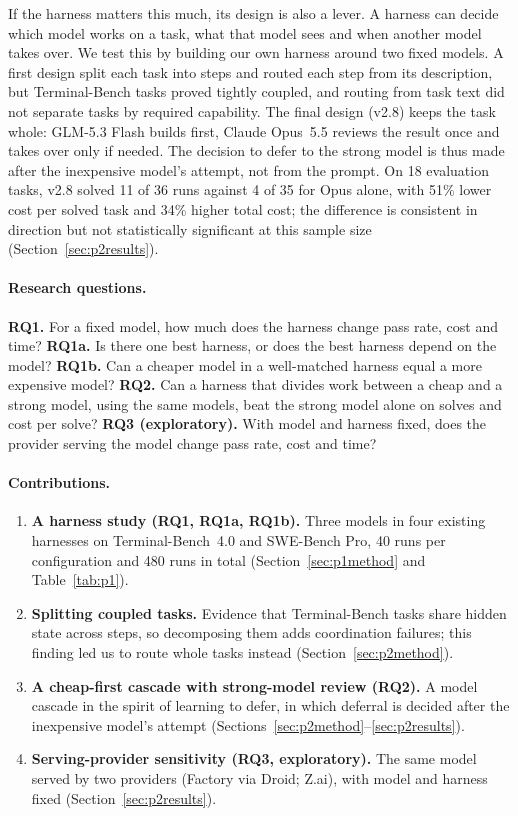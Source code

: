 If the harness matters this much, its design is also a lever. A harness can decide which model works on a task,
what that model sees and when another model takes over. We test this by building our own harness around two
fixed models. A first design split each task into steps and routed each step from its description, but
Terminal-Bench tasks proved tightly coupled, and routing from task text did not separate tasks by required
capability. The final design (v2.8) keeps the task whole: GLM-5.3 Flash builds first, Claude Opus~5.5 reviews the
result once and takes over only if needed. The decision to defer to the strong model is thus made after the
inexpensive model's attempt, not from the prompt. On 18 evaluation tasks, v2.8 solved 11 of 36 runs against 4 of
35 for Opus alone, with 51\% lower cost per solved task and 34\% higher total cost; the difference is consistent
in direction but not statistically significant at this sample size (Section~\ref{sec:p2results}).

\paragraph{Research questions.}
\textbf{RQ1.} For a fixed model, how much does the harness change pass rate, cost and time?
\textbf{RQ1a.} Is there one best harness, or does the best harness depend on the model?
\textbf{RQ1b.} Can a cheaper model in a well-matched harness equal a more expensive model?
\textbf{RQ2.} Can a harness that divides work between a cheap and a strong model, using the same models, beat
the strong model alone on solves and cost per solve?
\textbf{RQ3 (exploratory).} With model and harness fixed, does the provider serving the model change pass rate,
cost and time?
\paragraph{Contributions.}
\begin{enumerate}
  \item \textbf{A harness study (RQ1, RQ1a, RQ1b).} Three models in four existing harnesses on Terminal-Bench~4.0
        and SWE-Bench Pro, 40 runs per configuration and 480 runs in total
        (Section~\ref{sec:p1method} and Table~\ref{tab:p1}).
  \item \textbf{Splitting coupled tasks.} Evidence that Terminal-Bench tasks share hidden state across steps, so
        decomposing them adds coordination failures; this finding led us to route whole tasks instead
        (Section~\ref{sec:p2method}).
  \item \textbf{A cheap-first cascade with strong-model review (RQ2).} A model cascade in the spirit of
        learning to defer, in which deferral is decided after the inexpensive model's attempt
        (Sections~\ref{sec:p2method}--\ref{sec:p2results}).
  \item \textbf{Serving-provider sensitivity (RQ3, exploratory).} The same model served by two providers
        (Factory via Droid; Z.ai), with model and harness fixed (Section~\ref{sec:p2results}).
\end{enumerate}